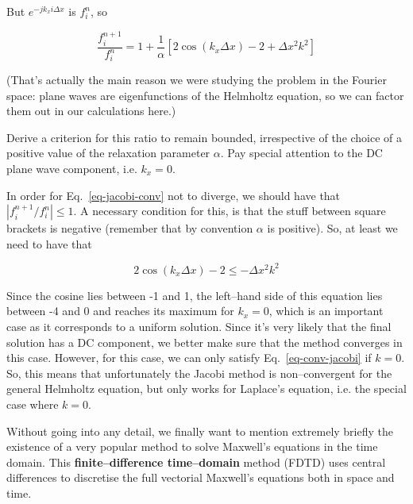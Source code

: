 But $ e^{-j k_x i \Delta x}$ is $f_i^n$, so

\begin{equation}
\frac{f_i^{n+1}}{f_i^{n}} =  1 + \frac{1}{\alpha}\left[2 \cos ( k_x  \Delta x) - 2 + \Delta x^2 k^2\right]
\label{eq-jacobi-conv}
\end{equation} 

(That's actually the main reason we were studying the problem in the Fourier space: plane waves are eigenfunctions of the Helmholtz equation, so we can factor them out in our calculations here.)

\begin{cue}
Derive a criterion for this ratio to remain bounded, irrespective of the choice of a positive value of the relaxation parameter $\alpha$. Pay special attention to the DC plane wave component, i.e. $k_x=0$. 
\end{cue}

 In order for Eq.~\ref{eq-jacobi-conv} not to diverge, we should have that $\left|f_i^{n+1} / f_i^{n}\right| \le 1$. A necessary condition for this, is that the stuff between square brackets is negative (remember that by convention $\alpha$ is positive). So, at least we need to have that

\begin{equation}
2 \cos ( k_x  \Delta x) - 2 \le - \Delta x^2 k^2 \label{eq-conv-jacobi}
\end{equation} 

Since the cosine lies between -1 and 1, the left--hand side of this equation lies between -4 and 0 and reaches its maximum for $k_x=0$, which is an important case as it corresponds to a uniform solution. Since it's very likely that the final solution has a DC component, we better make sure that the method converges in this case. However, for this case, we can only satisfy Eq.~\ref{eq-conv-jacobi} if $k=0$. So, this means that unfortunately the Jacobi method is non--convergent for the general Helmholtz equation, but only works for Laplace's equation, i.e. the special case where $k=0$.

\pagebreak

\label{week6}

Without going into any detail, we finally want to mention extremely briefly the existence of a very popular method to solve Maxwell's equations in the time domain. This \textbf{finite--difference time--domain} method (FDTD) uses central differences to discretise the full vectorial Maxwell's equations both in space and time.

